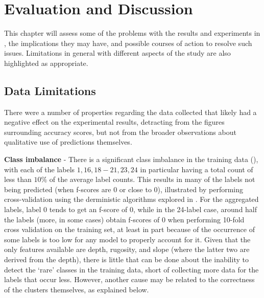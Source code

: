 \chapter{Evaluation and Discussion} \label{chap:evaluation}

This chapter will assess some of the problems with the results and experiments in , the implications they may have, and possible courses of action to resolve such issues. Limitations in general with different aspects of the study are also highlighted as appropriate.

\section{Data Limitations}
There were a number of properties regarding the data collected that likely had a negative effect on the experimental results, detracting from the figures surrounding accuracy scores, but not from the broader observations about qualitative use of predictions themselves.

\textbf{Class imbalance} -  There is a significant class imbalance in the training data (), with each of the labels $1, 16, 18-21, 23, 24$ in particular having a total count of less than $10\%$ of the average label counts. This results in many of the labels not being predicted (when f-scores are $0$ or close to $0$), illustrated by performing cross-validation using the derministic algorithms explored in . For the aggregated labels, label $0$ tends to get an f-score of 0, while in the 24-label case, around half the labels (more, in some cases) obtain f-scores of $0$ when performing 10-fold cross validation on the training set, at least in part because of the occurrence of some labels is too low for any model to properly account for it. Given that the only features available are depth, rugosity, and slope (where the latter two are derived from the depth), there is little that can be done about the inability to detect the `rare' classes in the training data, short of collecting more data for the labels that occur less. However, another cause may be related to the correctness of the clusters themselves, as explained below.


